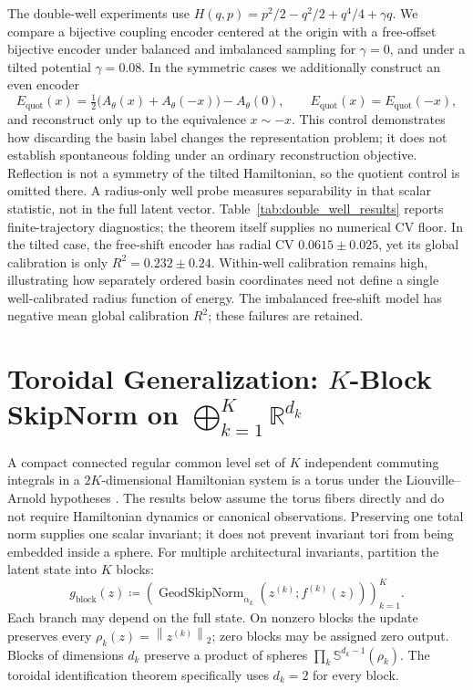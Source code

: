 \documentclass[10pt]{article}
\theoremstyle{definition}
\theoremstyle{remark}
\newcommand{\R}{\mathbb{R}}
\newcommand{\Sp}{\mathbb{S}}
\newcommand{\norm}[1]{\left\lVert #1 \right\rVert}
\begin{document}
The double-well experiments use $H(q,p)=p^2/2-q^2/2+q^4/4+\gamma q$. We compare a bijective coupling encoder centered at the origin with a free-offset bijective encoder under balanced and imbalanced sampling for $\gamma=0$, and under a tilted potential $\gamma=0.08$. In the symmetric cases we additionally construct an even encoder
\begin{equation}
 E_{\mathrm{quot}}(x)=\tfrac12\bigl(A_\theta(x)+A_\theta(-x)\bigr)-A_\theta(0),
 \qquad E_{\mathrm{quot}}(x)=E_{\mathrm{quot}}(-x),
\end{equation}
and reconstruct only up to the equivalence $x\sim-x$. This control demonstrates how discarding the basin label changes the representation problem; it does not establish spontaneous folding under an ordinary reconstruction objective. Reflection is not a symmetry of the tilted Hamiltonian, so the quotient control is omitted there. A radius-only well probe measures separability in that scalar statistic, not in the full latent vector. Table~\ref{tab:double_well_results} reports finite-trajectory diagnostics; the theorem itself supplies no numerical CV floor. In the tilted case, the free-shift encoder has radial CV $0.0615\pm0.025$, yet its global calibration is only $R^2=0.232\pm0.24$. Within-well calibration remains high, illustrating how separately ordered basin coordinates need not define a single well-calibrated radius function of energy. The imbalanced free-shift model has negative mean global calibration $R^2$; these failures are retained.

\section{Toroidal Generalization: $K$-Block SkipNorm on $\bigoplus_{k=1}^K \R^{d_k}$}
\label{sec:torus}

A compact connected regular common level set of $K$ independent commuting integrals in a $2K$-dimensional Hamiltonian system is a torus under the Liouville--Arnold hypotheses \citep{arnold1989mathematical}. The results below assume the torus fibers directly and do not require Hamiltonian dynamics or canonical observations. Preserving one total norm supplies one scalar invariant; it does not prevent invariant tori from being embedded inside a sphere. For multiple architectural invariants, partition the latent state into $K$ blocks:
\begin{equation}
    g_{\mathrm{block}}(z)\coloneqq
    \left(\operatorname{GeodSkipNorm}_{\alpha_k}(z^{(k)};f^{(k)}(z))\right)_{k=1}^K.
    \label{eq:kblock_skipnorm}
\end{equation}
Each branch may depend on the full state. On nonzero blocks the update preserves every $\rho_k(z)=\norm{z^{(k)}}_2$; zero blocks may be assigned zero output. Blocks of dimensions $d_k$ preserve a product of spheres $\prod_k\Sp^{d_k-1}(\rho_k)$. The toroidal identification theorem specifically uses $d_k=2$ for every block.
\end{document}
